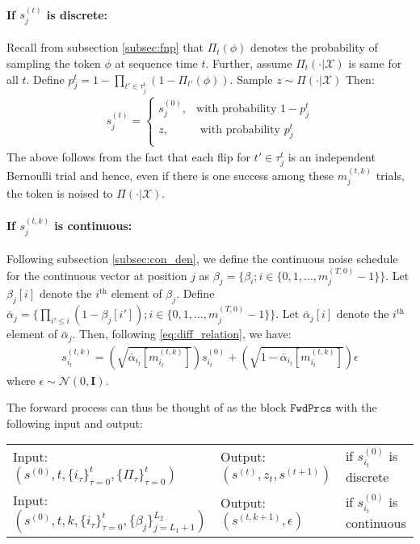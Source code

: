 \paragraph{If $s_{j}^{(t)}$ is discrete:\\}

Recall from subsection \ref{subsec:fnp} that $\Pi_{t}(\phi)$ denotes the probability of sampling the token $\phi$ at sequence time $t$. Further, assume $\Pi_t(\cdot | \mathcal{X})$ is same for all $t$. Define $p_{j}^t = 1 - \prod_{t' \in \tau_j^t} (1 - \Pi_{t'}(\phi))$. Sample $z \sim \Pi(\cdot|\mathcal{X})$  Then:
\begin{align*}
    s^{(t)}_{j} = 
    \begin{cases}
    s^{(0)}_{j},& \text{with probability } 1- p_j^t\\
    z,& \text{ with probability } p_j^t\\
    \end{cases}
\end{align*}
The above follows from the fact that each flip for $t' \in \tau_j^t$ is an independent Bernoulli trial and hence, even if there is one success among these $m_{j}^{(t, k)}$ trials, the token is noised to $\Pi(\cdot|\mathcal{X})$.

\paragraph{If $s_{j}^{(t, k)}$ is continuous:\\}

Following subsection \ref{subsec:con_den}, we define the continuous noise schedule for the continuous vector at position $j$ as  $\beta_j = \{ \beta_i; i \in \{0, 1, \dots, m_{j}^{(T, 0)}-1 \} \}$. Let $\beta_j[i]$ denote the $i^\text{th}$ element of $\beta_j$. Define $\bar{\alpha}_j = \{ \prod_{i' \leq i}(1 - \beta_j[i']); i \in \{0, 1, \dots, m_{j}^{(T, 0)}-1 \} \}$.  Let $\bar{\alpha}_j[i]$ denote the $i^\text{th}$ element of $\bar{\alpha}_j$. Then, following \eqref{eq:diff_relation}, we have:
\begin{align*}
    s^{(t, k)}_{i_t} = \left(\sqrt{\bar{\alpha}_{i_t}[m_{i_t}^{(t, k)}]}\right) s^{(0)}_{i_t} + \left(\sqrt{1 - \bar{\alpha}_{i_t}[m_{i_t}^{(t, k)}]}\right) \epsilon
\end{align*}
where $\epsilon \sim \mathcal{N}(0, \mathbf{I} )$.

The forward process can thus be thought of as the block $\texttt{FwdPrcs}$ with the following input and output:\\
\begin{tabular}{l l l}
  Input: $(s^{(0)}, t,  \{i_{\tau}\}_{\tau = 0}^t, \{\Pi_{\tau}\}_{\tau = 0}^t)$ & Output: $(s^{(t)}, z_{t}, s^{(t+1)})$ & if $s^{(0)}_{i_{t}}$ is discrete \\
  Input: $(s^{(0)}, t, k, \{i_{\tau}\}_{\tau = 0}^t, \{\beta_{j}\}_{j = L_1+1}^{L_2})$ & Output: $(s^{(t, k+1)}, \epsilon)$ & if $s^{(0)}_{i_t}$ is continuous \\
\end{tabular}


\newpage
